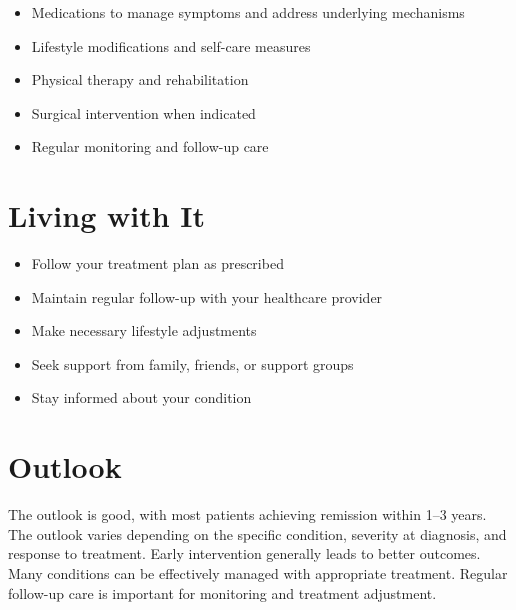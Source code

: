 \begin{itemize}[noitemsep]
  \item Medications to manage symptoms and address underlying mechanisms
  \item Lifestyle modifications and self-care measures
  \item Physical therapy and rehabilitation
  \item Surgical intervention when indicated
  \item Regular monitoring and follow-up care
\end{itemize}
\section{Living with It}
\begin{itemize}[noitemsep]
  \item Follow your treatment plan as prescribed
  \item Maintain regular follow-up with your healthcare provider
  \item Make necessary lifestyle adjustments
  \item Seek support from family, friends, or support groups
  \item Stay informed about your condition
\end{itemize}
\section{Outlook}
The outlook is good, with most patients achieving remission within 1--3 years. The outlook varies depending on the specific condition, severity at diagnosis, and response to treatment. Early intervention generally leads to better outcomes. Many conditions can be effectively managed with appropriate treatment. Regular follow-up care is important for monitoring and treatment adjustment.
